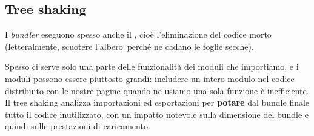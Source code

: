 \subsection{Tree shaking}

I \textit{bundler} eseguono spesso anche il , cioè
l'eliminazione del codice morto (letteralmente, \guillemotleft scuotere
l'albero\guillemotright\ perché ne cadano le foglie secche).

Spesso ci serve solo una parte delle funzionalità dei moduli che importiamo, e i
moduli possono essere piuttosto grandi: includere un intero modulo nel codice
distribuito con le nostre pagine quando ne usiamo una sola funzione è
inefficiente. Il tree shaking analizza importazioni ed esportazioni per
\textbf{potare} dal bundle finale tutto il codice inutilizzato, con un impatto
notevole sulla dimensione del bundle e quindi sulle prestazioni di caricamento.

